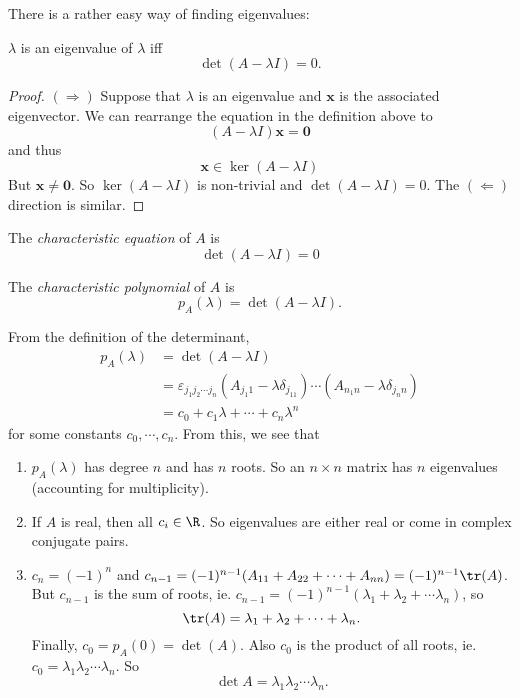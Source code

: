 \documentclass[a4paper]{article}
\begin{document}
There is a rather easy way of finding eigenvalues:
\begin{thm}
  $\lambda$ is an eigenvalue of $\lambda$ iff
  \[
    \det(A - \lambda I) = 0.
  \]
\end{thm}

\begin{proof}
  $(\Rightarrow)$ Suppose that $\lambda$ is an eigenvalue and $\mathbf{x}$ is the associated eigenvector. We can rearrange the equation in the definition above to
  \[
    (A - \lambda I)\mathbf{x} = \mathbf{0}
  \]
  and thus
  \[
    \mathbf{x}\in \ker(A - \lambda I)
  \]
  But $\mathbf{x}\not= \mathbf{0}$. So $\ker(A - \lambda I)$ is non-trivial and $\det(A - \lambda I) = 0$. The $(\Leftarrow)$ direction is similar.
\end{proof}

\begin{defi}
  The \emph{characteristic equation} of $A$ is
  \[
    \det(A - \lambda I) = 0
  \]
\end{defi}

\begin{defi}
  The \emph{characteristic polynomial} of $A$ is
  \[
    p_A(\lambda) = \det(A - \lambda I).
  \]
\end{defi}

From the definition of the determinant,
\begin{align*}
  p_A(\lambda) &= \det(A - \lambda I)\\
  &= \varepsilon_{j_1j_2\cdots j_n} (A_{j_1 1} - \lambda\delta_{j_11})\cdots (A_{n_1 n} - \lambda\delta_{j_nn})\\
  &= c_0 + c_1\lambda + \cdots + c_n\lambda^n
\end{align*}
for some constants $c_0, \cdots, c_n$. From this, we see that
\begin{enumerate}
  \item $p_A(\lambda)$ has degree $n$ and has $n$ roots. So an $n\times n$ matrix has $n$ eigenvalues (accounting for multiplicity).
  \item If $A$ is real, then all $c_i\in \R$. So eigenvalues are either real or come in complex conjugate pairs.
  \item $c_n = (-1)^n$ and $c_{n - 1} = (-1)^{n - 1}(A_{11} + A_{22} + \cdots + A_{nn}) = (-1)^{n - 1}\tr(A)$. But $c_{n -1}$ is the sum of roots, ie. $c_{n - 1}= (-1)^{n - 1}(\lambda_1 + \lambda_2 + \cdots \lambda_n)$, so
    \[
      \tr(A) = \lambda_1 + \lambda_2 + \cdots + \lambda_n.
    \]
    Finally, $c_0 = p_A(0) = \det(A)$. Also $c_0$ is the product of all roots, ie. $c_0 = \lambda_1\lambda_2\cdots \lambda_n$. So
    \[
      \det A = \lambda_1\lambda_2\cdots \lambda_n.
    \]
\end{enumerate}
\end{document}
